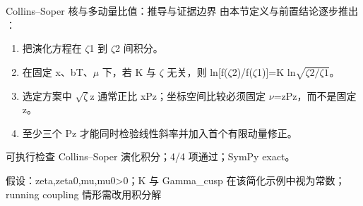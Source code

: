 \begin{frame}[t]{Collins--Soper 核与多动量比值：推导与证据边界}
\footnotesize
{}\quad 由本节定义与前置结论逐步推出 ：
\begin{enumerate}
\item 把演化方程在 \ensuremath{\zeta}1 到 \ensuremath{\zeta}2 间积分。
\item 在固定 x、bT、\ensuremath{\mu} 下，若 K 与 \ensuremath{\zeta} 无关，则 ln[f(\ensuremath{\zeta}2)/\allowbreak{}f(\ensuremath{\zeta}1)]=K ln\ensuremath{\sqrt{\zeta2/\zeta1}}。
\item 选定方案中 \ensuremath{\sqrt{\zeta}}z 通常正比 xPz；坐标空间比较必须固定 \ensuremath{\nu}=zPz，而不是固定 z。
\item 至少三个 Pz 才能同时检验线性斜率并加入首个有限动量修正。
\end{enumerate}\begin{block}{可执行检查}
\quad Collins--Soper 演化积分；4/4 项通过；SymPy exact。
\par\scriptsize 假设：zeta,zeta0,mu,mu0>0；K 与 Gamma\_cusp 在该简化示例中视为常数；running coupling 情形需改用积分解
\end{block}
\end{frame}

